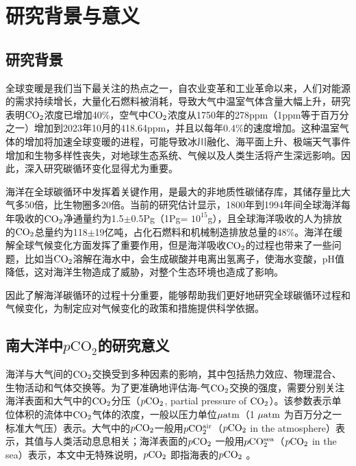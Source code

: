 \section{研究背景与意义}
\subsection{研究背景}
全球变暖是我们当下最关注的热点之一，自农业变革和工业革命以来，人们对能源的需求持续增长，大量化石燃料被消耗，导致大气中温室气体含量大幅上升，研究表明$\rm CO_2$浓度已增加40\%，空气中$\rm CO_2$浓度从1750年的278ppm（1ppm等于百万分之一）增加到2023年10月的418.64ppm，并且以每年0.4\%的速度增加\cite{lan2024trends,JDYZ200103003}。这种温室气体的增加将加速全球变暖的进程，可能导致冰川融化、海平面上升、极端天气事件增加和生物多样性丧失，对地球生态系统、气候以及人类生活将产生深远影响\cite{陈立奇2004北极地区碳循环研究意义和展望,RASOOL_DE_BERGH_1970,Haines_2003,苏茜2017,ZKJZ200907010}。因此，深入研究碳循环变化显得尤为重要。

海洋在全球碳循环中发挥着关键作用，是最大的非地质性碳储存库，其储存量比大气多50倍，比生物圈多20倍\cite{陈立奇2004北极地区碳循环研究意义和展望,SJKF200204011}。当前的研究估计显示，1800年到1994年间全球海洋每年吸收的$\rm CO_2$净通量约为1.5$\pm$0.5Pg（1Pg= $10^{15}$g），且全球海洋吸收的人为排放的$\rm CO_2$总量约为118$\pm$19亿吨，占化石燃料和机械制造排放总量的48\%\cite{Sabine_2004}。海洋在缓解全球气候变化方面发挥了重要作用\cite{DXJZ201204005}，但是海洋吸收$\rm CO_2$的过程也带来了一些问题，比如当$\rm CO_2$溶解在海水中，会生成碳酸并电离出氢离子，使海水变酸，pH值降低，这对海洋生物造成了威胁，对整个生态环境也造成了影响\cite{海水酸化对海洋生物影响的研究进展,升温耦合酸化对大型海藻灾害种氮响应与吸收机制研究,苏茜2017,JDYZ201603011}。

因此了解海洋碳循环的过程十分重要，能够帮助我们更好地研究全球碳循环过程和气候变化，为制定应对气候变化的政策和措施提供科学依据。

\subsection{南大洋中\texorpdfstring{$p\mathrm{CO_2}$}{}的研究意义}
海洋与大气间的$\rm CO_2$交换受到多种因素的影响，其中包括热力效应、物理混合、生物活动和气体交换等\cite{clargo2015rapid,周洁_2014,陈鑫2012,lefevre2002estimating}。为了更准确地评估海-气$\rm CO_2$交换的强度，需要分别关注海洋表面和大气中的$\rm CO_2$分压（$p\rm CO_2$, partial pressure of $\rm CO_2$）。该参数表示单位体积的流体中$\rm CO_2$气体的浓度，一般以压力单位$\rm \mu atm$（1 $\rm \mu atm$ 为百万分之一标准大气压）表示。大气中的$p\rm CO_2$一般用$p\rm CO_2^{air}$（$p\rm CO_2$ in the atmosphere）表示，其值与人类活动息息相关；海洋表面的$p\rm CO_2$ 一般用$p\rm CO_2^{sea}$（$p\rm CO_2$ in the sea）表示，本文中无特殊说明，$p\rm CO_2$ 即指海表的$p\rm CO_2$ 。

